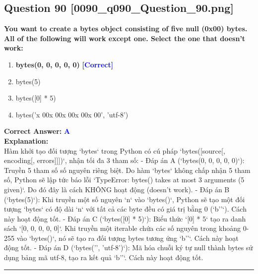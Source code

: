 \documentclass[11pt,a4paper]{article}
\begin{document}
\begin{minipage}{\textwidth}
\subsection*{Question 90 \quad \footnotesize{[0090_q090_Question_90.png]}}
\noindent \textbf{You want to create a bytes object consisting of five null (0x00) bytes. All of the following will work except one. Select the one that doesn't work:}

\begin{enumerate}[label=\Alph*.]
    \item \textbf{bytes(0, 0, 0, 0, 0)} \hfill \textcolor{blue}{\textbf{[Correct]}}
    \item bytes(5)
    \item bytes([0] * 5)
    \item bytes('x 00x 00x 00x 00x 00', 'utf-8')
\end{enumerate}

\noindent \textbf{Correct Answer:} \textcolor{blue}{\textbf{A}} \\[4pt]
\noindent \textbf{Explanation:}\\
Hàm khởi tạo đối tượng `bytes` trong Python có cú pháp `bytes([source[, encoding[, errors]]])`, nhận tối đa 3 tham số:\newline
- Đáp án A (`bytes(0, 0, 0, 0, 0)`): Truyền 5 tham số số nguyên riêng biệt. Do hàm `bytes` không chấp nhận 5 tham số, Python sẽ lập tức báo lỗi `TypeError: bytes() takes at most 3 arguments (5 given)`. Do đó đây là cách KHÔNG hoạt động (doesn't work).\newline
- Đáp án B (`bytes(5)`): Khi truyền một số nguyên `n` vào `bytes()`, Python sẽ tạo một đối tượng `bytes` có độ dài `n` với tất cả các byte đều có giá trị bằng 0 (`b''`). Cách này hoạt động tốt.\newline
- Đáp án C (`bytes([0] * 5)`): Biểu thức `[0] * 5` tạo ra danh sách `[0, 0, 0, 0, 0]`. Khi truyền một iterable chứa các số nguyên trong khoảng 0-255 vào `bytes()`, nó sẽ tạo ra đối tượng bytes tương ứng `b''`. Cách này hoạt động tốt.\newline
- Đáp án D (`bytes('', 'utf-8')`): Mã hóa chuỗi ký tự null thành bytes sử dụng bảng mã utf-8, tạo ra kết quả `b''`. Cách này hoạt động tốt.
\end{minipage}
\vspace{0.8cm}
\hrule
\vspace{0.5cm}
\end{document}
